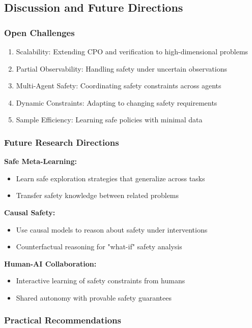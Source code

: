 \documentclass[12pt]{article}
\begin{document}
{{{{\subsection{Discussion and Future Directions}

\subsubsection{Open Challenges}

\begin{enumerate}
\item Scalability: Extending CPO and verification to high-dimensional problems
\item Partial Observability: Handling safety under uncertain observations
\item Multi-Agent Safety: Coordinating safety constraints across agents
\item Dynamic Constraints: Adapting to changing safety requirements
\item Sample Efficiency: Learning safe policies with minimal data
\end{enumerate}

\subsubsection{Future Research Directions}

\textbf{Safe Meta-Learning:}
\begin{itemize}
\item Learn safe exploration strategies that generalize across tasks
\item Transfer safety knowledge between related problems
\end{itemize}

\textbf{Causal Safety:}
\begin{itemize}
\item Use causal models to reason about safety under interventions
\item Counterfactual reasoning for "what-if" safety analysis
\end{itemize}

\textbf{Human-AI Collaboration:}
\begin{itemize}
\item Interactive learning of safety constraints from humans
\item Shared autonomy with provable safety guarantees
\end{itemize}

\subsubsection{Practical Recommendations}

}}}}
\end{document}
